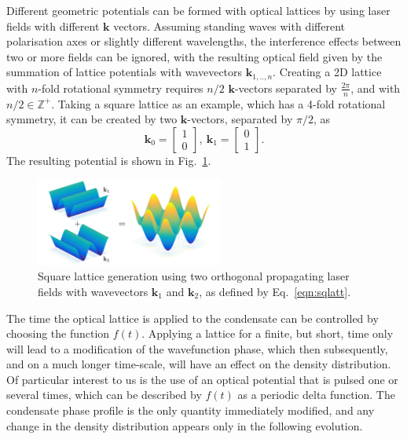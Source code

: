 {%
Different geometric potentials can be formed with optical lattices by using laser fields with different $\mathbf{k}$ vectors. Assuming standing waves with different polarisation axes or slightly different wavelengths, the interference effects between two or more fields can be ignored, with the resulting optical field given by the summation of lattice potentials with wavevectors $\mathbf{k}_{1,..,n}$. Creating a 2D lattice with $n$-fold rotational symmetry requires $n/2$ $\mathbf{k}$-vectors separated by $\frac{2\pi}{n}$, and with $n/2 \in \mathbb{Z}^{+}$. Taking a square lattice as an example, which has a 4-fold rotational symmetry, it can be created by two $\mathbf{k}$-vectors, separated by $\pi/2$, as
\begin{equation}
    \mathbf{k}_0 = \left[ \begin{array}{cc}
    1 \\
    0
    \end{array} \right],~
    \mathbf{k}_1 =
    \left[ \begin{array}{cc}
     0 \\
     1
    \end{array} \right].\label{eqn:sqlatt}
\end{equation}
The resulting potential is shown in Fig.~\ref{fig:cos2xy}.
\begin{figure}\centering
    \includegraphics[width=0.55\textwidth]{./Images/ch4_vtx/VOPT/squarelatt}
    \caption{Square lattice generation using two orthogonal propagating laser fields with wavevectors $\mathbf{k}_1$ and $\mathbf{k}_2$, as defined by Eq.~\eqref{eqn:sqlatt}.}\label{fig:cos2xy}
\end{figure}
The time the optical lattice is applied to the condensate can be controlled by choosing the function $f(t)$. Applying a lattice for a finite, but short, time only will lead to a modification of the wavefunction phase, which then subsequently, and on a much longer time-scale, will have an effect on the density distribution. Of particular interest to us is the use of an optical potential that is pulsed one or several times, which can be described by $f(t)$ as a periodic delta function. The condensate phase profile is the only quantity immediately modified, and any change in the density distribution appears only in the following evolution.

}
